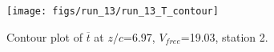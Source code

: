 \begin{figure}[H]
\centering
\texttt{[image: figs/run\_13/run\_13\_T\_contour]}
\caption{Contour plot of $\overline{t}$ at $z/c$=6.97, $V_{free}$=19.03, station 2.}
\label{fig:run_13_T_contour}
\end{figure}


